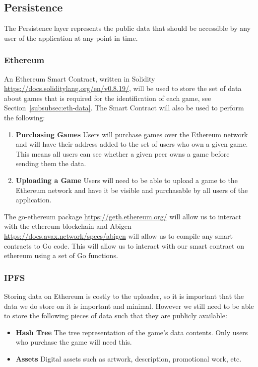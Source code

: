 
\subsection{Persistence}

The Persistence layer represents the public data that should be accessible by any user of the application at any point in time. 

\subsubsection*{Ethereum}\label{subsubsec:impl-eth}

An Ethereum Smart Contract, written in Solidity \url{https://docs.soliditylang.org/en/v0.8.19/}, will be used to store the set of data about games that is required for the identification of each game, see Section~\ref{subsubsec:eth-data}. The Smart Contract will also be used to perform the following:

\begin{enumerate}
  \item \textbf{Purchasing Games} Users will purchase games over the Ethereum network and will have their address added to the set of users who own a given game. This means all users can see whether a given peer owns a game before sending them the data.
  \item \textbf{Uploading a Game} Users will need to be able to upload a game to the Ethereum network and have it be visible and purchasable by all users of the application.
\end{enumerate}

\vspace{2mm}\noindent
The go-ethereum package \url{https://geth.ethereum.org/} will allow us to interact with the ethereum blockchain and Abigen \url{https://docs.avax.network/specs/abigen} will allow us to compile any smart contracts to Go code. This will allow us to interact with our smart contract on ethereum using a set of Go functions.


\subsubsection*{IPFS}

Storing data on Ethereum is costly to the uploader, so it is important that the data we do store on it is important and minimal. However we still need to be able to store the following pieces of data such that they are publicly available:

\begin{itemize}
  \item \textbf{Hash Tree} The tree representation of the game's data contents. Only users who purchase the game will need this.
  \item \textbf{Assets} Digital assets such as artwork, description, promotional work, etc.  
\end{itemize}

